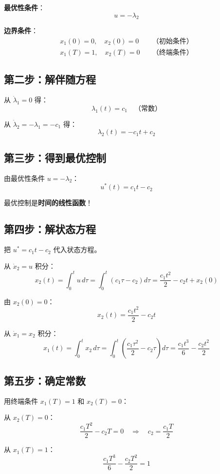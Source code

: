 \textbf{最优性条件}：
\[
u = -\lambda_2
\]

\textbf{边界条件}：
\begin{align}
x_1(0) = 0, \quad x_2(0) = 0 \quad &\text{（初始条件）} \\
x_1(T) = 1, \quad x_2(T) = 0 \quad &\text{（终端条件）}
\end{align}

\subsection{第二步：解伴随方程}

从 $\dot{\lambda}_1 = 0$ 得：
\[
\lambda_1(t) = c_1 \quad \text{（常数）}
\]

从 $\dot{\lambda}_2 = -\lambda_1 = -c_1$ 得：
\[
\lambda_2(t) = -c_1 t + c_2
\]

\subsection{第三步：得到最优控制}

由最优性条件 $u = -\lambda_2$：
\[
u^*(t) = c_1 t - c_2
\]

最优控制是\textbf{时间的线性函数}！

\subsection{第四步：解状态方程}

把 $u^* = c_1 t - c_2$ 代入状态方程。

从 $\dot{x}_2 = u$ 积分：
\[
x_2(t) = \int_0^t u \, d\tau = \int_0^t (c_1 \tau - c_2) d\tau = \frac{c_1 t^2}{2} - c_2 t + x_2(0)
\]

由 $x_2(0) = 0$：
\[
x_2(t) = \frac{c_1 t^2}{2} - c_2 t
\]

从 $\dot{x}_1 = x_2$ 积分：
\[
x_1(t) = \int_0^t x_2 \, d\tau = \int_0^t \left(\frac{c_1 \tau^2}{2} - c_2 \tau\right) d\tau = \frac{c_1 t^3}{6} - \frac{c_2 t^2}{2}
\]

\subsection{第五步：确定常数}

用终端条件 $x_1(T) = 1$ 和 $x_2(T) = 0$：

从 $x_2(T) = 0$：
\[
\frac{c_1 T^2}{2} - c_2 T = 0 \quad \Rightarrow \quad c_2 = \frac{c_1 T}{2}
\]

从 $x_1(T) = 1$：
\[
\frac{c_1 T^3}{6} - \frac{c_2 T^2}{2} = 1
\]

